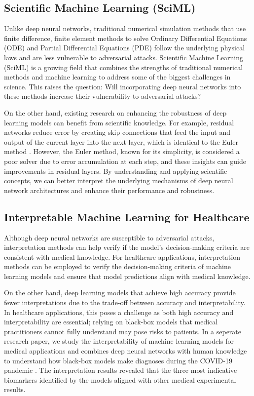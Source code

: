 \subsection{Scientific Machine Learning (SciML)}

Unlike deep neural networks, traditional numerical simulation methods that use finite difference, finite element methods to solve Ordinary Differential Equations (ODE) and Partial Differential Equations (PDE) follow the underlying physical laws and are less vulnerable to adversarial attacks. Scientific Machine Learning (SciML) is a growing field that combines the strengths of traditional numerical methods and machine learning to address some of the biggest challenges in science. This raises the question: Will incorporating deep neural networks into these methods increase their vulnerability to adversarial attacks? 


On the other hand, existing research on enhancing the robustness of deep learning models can benefit from scientific knowledge. For example, residual networks reduce error by creating skip connections that feed the input and output of the current layer into the next layer, which is identical to the Euler method \citep{chen2018neural}. However, the Euler method, known for its simplicity, is considered a poor solver due to error accumulation at each step, and these insights can guide improvements in residual layers. By understanding and applying scientific concepts, we can better interpret the underlying mechanisms of deep neural network architectures and enhance their performance and robustness.

\subsection{Interpretable Machine Learning for Healthcare}

Although deep neural networks are susceptible to adversarial attacks, interpretation methods can help verify if the model's decision-making criteria are consistent with medical knowledge. For healthcare applications, interpretation methods can be employed to verify the decision-making criteria of machine learning models and ensure that model predictions align with medical knowledge.

On the other hand, deep learning models that achieve high accuracy provide fewer interpretations due to the trade-off between accuracy and interpretability. In healthcare applications, this poses a challenge as both high accuracy and interpretability are essential; relying on black-box models that medical practitioners cannot fully understand may pose risks to patients. In a seperate research paper, we study the interpretability of machine learning models for medical applications and combines deep neural networks with human knowledge to understand how black-box models make diagnoses during the COVID-19 pandemic \citep{han2021interpret}. The interpretation results revealed that the three most indicative biomarkers identified by the models aligned with other medical experimental results.

